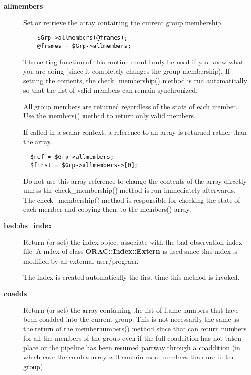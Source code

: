 \begin{description}

\item[\textbf{allmembers}] \mbox{}

Set or retrieve the array containing the current group membership.

\begin{verbatim}
    $Grp->allmembers(@frames);
    @frames = $Grp->allmembers;
\end{verbatim}


The setting function of this routine should only be used
if you know what you are doing (since it completely changes the group
membership). If setting the contents, the check\_membership() method
is run automatically so that the list of valid members can remain
synchronized.



All group members are returned regardless of the state of each member.
Use the members() method to return only valid members.



If called in a scalar context, a reference to an array is returned
rather than the array.

\begin{verbatim}
  $ref = $Grp->allmembers;
  $first = $Grp->allmembers->[0];
\end{verbatim}


Do not use this array reference to change the contents of the array
directly unless the check\_membership() method is run immediately
afterwards. The check\_membership() method is responsible for 
checking the state of each member and copying them to the members()
array.


\item[\textbf{badobs\_index}] \mbox{}

Return (or set) the index object associate with the bad observation
index file. A index of class \textbf{ORAC::Index::Extern} is used since 
this index is modified by an external user/program.



The index is created automatically the first time this method
is invoked.


\item[\textbf{coadds}] \mbox{}

Return (or set) the array containing the list of frame numbers that have
been coadded into the current group. This is not necessarily the same
as the return of the membernumbers() method since that can return numbers
for all the members of the group even if the full coaddition has not
taken place or the pipeline has been resumed partway through a coaddition
(in which case the coadds array will contain more numbers than are in the
group).


\end{description}
